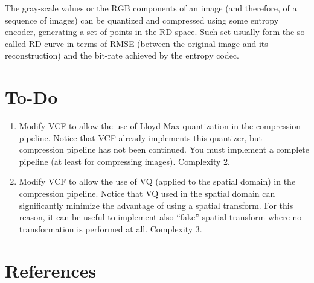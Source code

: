 The gray-scale values or the $\text{RGB}$ components of an image (and
therefore, of a sequence of images) can be quantized and compressed
using some entropy encoder, generating a set of points in the RD
space. Such set usually form the so called RD curve in terms of RMSE
(between the original image and its reconstruction) and the bit-rate
achieved by the entropy codec.

\section{To-Do}
\begin{enumerate}
\item Modify VCF to allow the use of Lloyd-Max quantization in the
  compression pipeline. Notice that VCF already implements this
  quantizer, but compression pipeline has not been continued. You must
  implement a complete pipeline (at least for compressing
  images). Complexity 2.
\item Modify VCF to allow the use of VQ (applied to the spatial
  domain) in the compression pipeline. Notice that VQ used in the
  spatial domain can significantly minimize the advantage of using a
  spatial transform. For this reason, it can be useful to implement
  also ``fake'' spatial transform where no transformation is performed
  at all. Complexity 3.
\end{enumerate}

\section{References}

\renewcommand{\addcontentsline}[3]{}%

